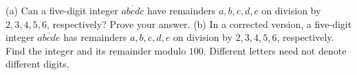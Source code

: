 (a) Can a five-digit integer $\overline{abcdc}$ have remainders $a,b,c,d,c$ on division by $2,3,4,5,6$, respectively? Prove your answer.
(b) In a corrected version, a five-digit integer $\overline{abcde}$ has remainders $a,b,c,d,e$ on division by $2,3,4,5,6$, respectively. Find the integer and its remainder modulo $100$. Different letters need not denote different digits.
